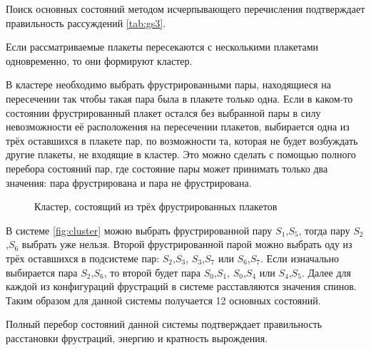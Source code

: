 \documentclass[utf8, babel, sor, jor, amsmath, amssymb, reprint]{elsarticle} %
\begin{document}
Поиск основных состояний методом исчерпывающего перечисления подтверждает правильность рассуждений \eqref{tab:gs3}.

Если рассматриваемые плакеты пересекаются с несколькими плакетами одновременно, то они формируют кластер.

В кластере необходимо выбрать фрустрированными пары, находящиеся на пересечении так чтобы такая пара была в плакете только одна. Если в каком-то состоянии фрустрированный плакет остался без выбранной пары в силу невозможности её расположения на пересечении плакетов, выбирается одна из трёх оставшихся в плакете пар, по возможности та, которая не будет возбуждать другие плакеты, не входящие в кластер. Это можно сделать с помощью полного перебора состояний пар, где состояние пары может принимать только два значения: пара фрустрирована и пара не фрустрирована.

\begin{figure}[h]
	\centering
	\caption{Кластер, состоящий из трёх фрустрированных плакетов}
	\label{fig:cluster}
\end{figure}

В системе \eqref{fig:cluster}  можно выбрать фрустрированной пару $S_1$,$S_5$, тогда пару  $S_2$,$S_6$ выбрать уже нельзя. Второй фрустрированной парой можно выбрать оду из трёх оставшихся в подсистеме пар: $S_2$,$S_3$, $S_3$,$S_7$ или $S_6$,$S_7$. Если изначально выбирается пара $S_2$,$S_6$, то второй будет пара $S_0$,$S_1$, $S_0$,$S_4$ или $S_4$,$S_5$. Далее для каждой из конфигураций фрустраций в системе расставляются значения спинов. Таким образом для данной системы получается 12 основных состояний. 

Полный перебор состояний данной системы подтверждает правильность расстановки фрустраций, энергию и кратность вырождения.
\end{document}

